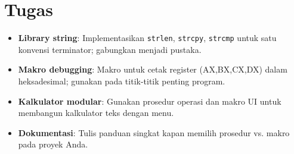 \section{Tugas}
\begin{itemize}
  \item \textbf{Library string}: Implementasikan \texttt{strlen}, \texttt{strcpy}, \texttt{strcmp} untuk satu konvensi terminator; gabungkan menjadi pustaka.
  \item \textbf{Makro debugging}: Makro untuk cetak register (AX,BX,CX,DX) dalam heksadesimal; gunakan pada titik-titik penting program.
  \item \textbf{Kalkulator modular}: Gunakan prosedur operasi dan makro UI untuk membangun kalkulator teks dengan menu.
  \item \textbf{Dokumentasi}: Tulis panduan singkat kapan memilih prosedur vs. makro pada proyek Anda.
\end{itemize}

